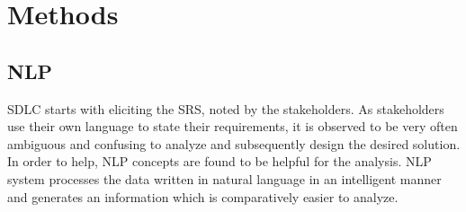\section{Methods}

\subsection{\gls{NLP}}
\gls{SDLC} starts with eliciting the \gls{SRS}, noted by the stakeholders. As stakeholders use their own language to state their requirements, it is observed to be very often ambiguous and confusing to analyze and subsequently design the desired solution. In order to help, \gls{NLP} concepts are found to be helpful for the analysis. \gls{NLP} system processes the data written in natural
language in an intelligent manner and generates an information which is comparatively easier to analyze.\cite{Tripathy}
